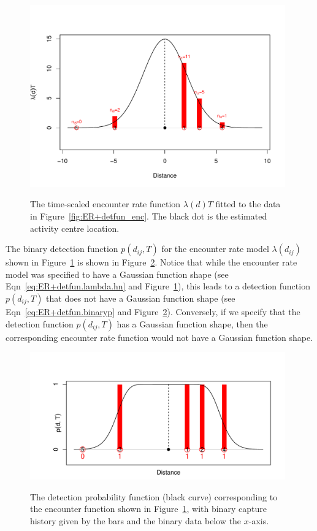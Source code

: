 \begin{figure}[ht]
\caption{\small The time-scaled encounter rate function $\lambda(d)T$ fitted to the data in Figure~\ref{fig:ER+detfun_enc}. The black dot is the estimated activity centre location.}
\centering
\vspace{-24pt}
\includegraphics[width=11cm]{keepfigure/EandN.pdf}
\label{fig:ER+detfun_EandN}
\end{figure}

\afterpage{\clearpage}

The binary detection function $p(d_{ij},T)$ for the encounter rate model $\lambda(d_{ij})$ shown in Figure~\ref{fig:ER+detfun_EandN} is shown in Figure~\ref{fig:ER+detfun_binp}. Notice that while the encounter rate model was specified to have a Gaussian function shape (see Eqn~\eqref{eq:ER+detfun.lambda.hn} and Figure~\ref{fig:ER+detfun_EandN}), this leads to a detection function $p(d_{ij},T)$ that does not have a Gaussian function shape (see Eqn~\eqref{eq:ER+detfun.binaryp} and Figure~\ref{fig:ER+detfun_binp}). Conversely, if we specify that the detection function $p(d_{ij},T)$ has a Gaussian function shape, then the corresponding encounter rate function would not have a Gaussian function shape.

\begin{figure}[ht]
\caption{\small The detection probability function (black curve) corresponding to the encounter function shown in Figure~\ref{fig:ER+detfun_EandN}, with binary capture history given by the bars and the binary data below the $x$-axis.}
\centering
\vspace{-24pt}
\includegraphics[width=11cm]{keepfigure/binp.pdf}
\label{fig:ER+detfun_binp}
\end{figure}


